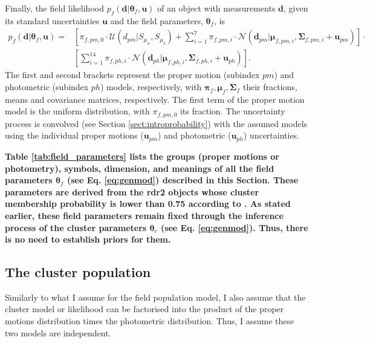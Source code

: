Finally, the field likelihood $p_f(\mathbf{d}|\boldsymbol{\theta}_f,\mathbf{u})$ of an object with measurements $\mathbf{d}$, given its standard uncertainties $\mathbf{u}$ and the field parameters, $\boldsymbol{\theta}_f$, is
\begin{align}
p_f(\mathbf{d}|\boldsymbol{\theta}_f,\mathbf{u})=&\left[\pi_{f,pm,0}\cdot\mathcal{U}({d}_{pm}|S_{\mu_{\alpha}},S_{\mu_{\delta}})+  \sum \limits_{i=1}^{7}\pi_{f,pm,i}\cdot \mathcal{N}(\mathbf{d}_{pm} | \boldsymbol{\mu}_{f,pm,i},\boldsymbol{\Sigma}_{f,pm,i}+\mathbf{u}_{pm})\right]\cdot  \nonumber \\ 
&\left[ \sum \limits_{i=1}^{14}\pi_{f,ph,i}\cdot \mathcal{N}(\mathbf{d}_{ph} | \boldsymbol{\mu}_{f,ph,i},\boldsymbol{\Sigma}_{f,ph,i}+\mathbf{u}_{ph})\right].
\label{eq:field}
\end{align}
The first and second brackets represent the proper motion (subindex $pm$) and photometric (subindex $ph$) models, respectively, with $\boldsymbol{\pi}_f,\boldsymbol{\mu}_f,\boldsymbol{\Sigma}_f$ their fractions, means and covariance matrices, respectively. The first term of the proper motion model is the uniform distribution, with $\pi_{f,pm,0}$ its fraction. The uncertainty process is convolved (see Section \ref{sect:introprobability}) with the assumed models using the individual proper motions ($\mathbf{u}_{pm}$) and photometric ($\mathbf{u}_{ph}$) uncertainties. 

\textbf{Table \ref{tab:field_parameters} lists the groups (proper motions or photometry), symbols, dimension, and meanings of all the field parameters $\boldsymbol{\theta}_f$ (see Eq. \ref{eq:genmod}) described in this Section. These parameters are derived from the \gls{rdr2} objects whose cluster membership probability is lower than 0.75 according to \citet{Bouy2015}. As stated earlier, these field parameters remain fixed through the inference process of the cluster parameters $\boldsymbol{\theta}_c$ (see Eq. \ref{eq:genmod}). Thus, there is no need to establish priors for them. }



\subsection{The cluster population}
\label{subsect:cluster}
Similarly to what I assume for the field population model, I also assume that the cluster model or likelihood can be factorised into the product of the proper motions distribution times the photometric distribution. Thus, I assume these two models are independent. 

